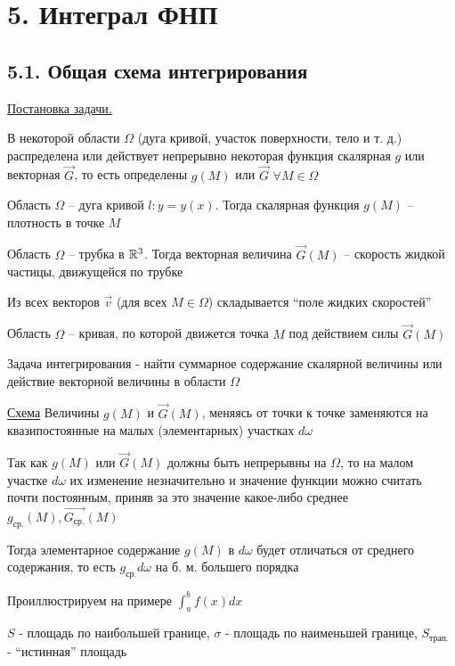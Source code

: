 \documentclass[12pt]{article}
\begin{document}
    \clearpage

    \section{5. Интеграл ФНП}

    \subsection{5.1. Общая схема интегрирования}

    \underline{Постановка задачи.}

    В некоторой области $\Omega$ (дуга кривой, участок поверхности, тело и т. д.)
    распределена или действует непрерывно некоторая функция скалярная $g$ или векторная $\vec{G}$,
    то есть определены $g(M)$ или $\vec{G}$ $\forall M \in \Omega$

    \Ex Область $\Omega$ -- дуга кривой $l : y = y(x)$. Тогда скалярная функция $g(M)$ -- плотность в точке $M$

    \Exs Область $\Omega$ -- трубка в $\mathbb{R}^3$. Тогда векторная величина $\vec{G}(M)$ -- скорость жидкой частицы, движущейся по трубке

    Из всех векторов $\vec{v}$ (для всех $M \in \Omega$) складывается \enquote{поле жидких скоростей}

    \Exs Область $\Omega$ -- кривая, по которой движется точка $M$ под действием силы $\vec{G}(M)$



    Задача интегрирования - найти суммарное содержание скалярной величины или действие векторной величины в области $\Omega$

    \underline{Схема} Величины $g(M)$ и $\overrightarrow{G}(M)$, меняясь от точки к точке заменяются на квазипостоянные на малых (элементарных) участках $d\omega$

    Так как $g(M)$ или $\overrightarrow{G}(M)$ должны быть непрерывны на $\Omega$, то на малом участке $d\omega$ их изменение незначительно и
    значение функции можно считать почти постоянным, приняв за это значение какое-либо среднее $g_{\text{ср.}}(M), \overrightarrow{G_{\text{ср.}}}(M)$

    Тогда элементарное содержание $g(M)$ в $d\omega$ будет отличаться от среднего содержания, то есть $g_{\text{ср.}}d\omega$ на б. м. большего порядка

    \Ex Проиллюстрируем на примере $\int_a^b f(x) dx$

    $S$ - площадь по наибольшей границе, $\sigma$ - площадь по наименьшей границе, $S_{\text{трап.}}$ - \enquote{истинная} площадь
\end{document}
